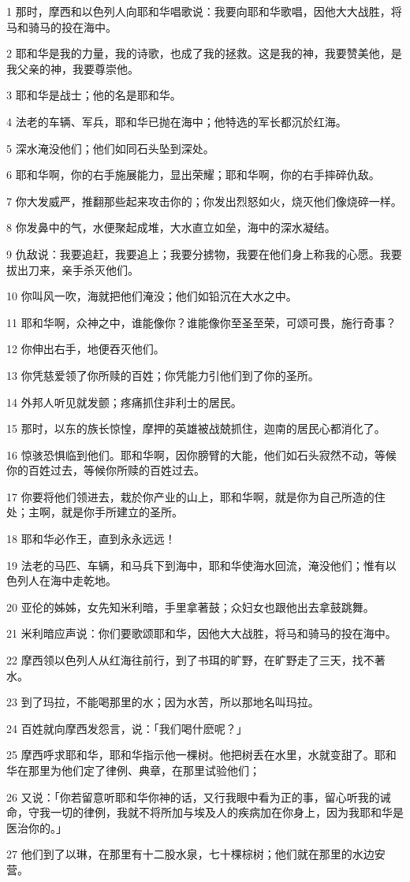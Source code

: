 \par 1 那时，摩西和以色列人向耶和华唱歌说：我要向耶和华歌唱，因他大大战胜，将马和骑马的投在海中。
\par 2 耶和华是我的力量，我的诗歌，也成了我的拯救。这是我的神，我要赞美他，是我父亲的神，我要尊崇他。
\par 3 耶和华是战士；他的名是耶和华。
\par 4 法老的车辆、军兵，耶和华已抛在海中；他特选的军长都沉於红海。
\par 5 深水淹没他们；他们如同石头坠到深处。
\par 6 耶和华啊，你的右手施展能力，显出荣耀；耶和华啊，你的右手摔碎仇敌。
\par 7 你大发威严，推翻那些起来攻击你的；你发出烈怒如火，烧灭他们像烧碎一样。
\par 8 你发鼻中的气，水便聚起成堆，大水直立如垒，海中的深水凝结。
\par 9 仇敌说：我要追赶，我要追上；我要分掳物，我要在他们身上称我的心愿。我要拔出刀来，亲手杀灭他们。
\par 10 你叫风一吹，海就把他们淹没；他们如铅沉在大水之中。
\par 11 耶和华啊，众神之中，谁能像你？谁能像你至圣至荣，可颂可畏，施行奇事？
\par 12 你伸出右手，地便吞灭他们。
\par 13 你凭慈爱领了你所赎的百姓；你凭能力引他们到了你的圣所。
\par 14 外邦人听见就发颤；疼痛抓住非利士的居民。
\par 15 那时，以东的族长惊惶，摩押的英雄被战兢抓住，迦南的居民心都消化了。
\par 16 惊骇恐惧临到他们。耶和华啊，因你膀臂的大能，他们如石头寂然不动，等候你的百姓过去，等候你所赎的百姓过去。
\par 17 你要将他们领进去，栽於你产业的山上，耶和华啊，就是你为自己所造的住处；主啊，就是你手所建立的圣所。
\par 18 耶和华必作王，直到永永远远！
\par 19 法老的马匹、车辆，和马兵下到海中，耶和华使海水回流，淹没他们；惟有以色列人在海中走乾地。
\par 20 亚伦的姊姊，女先知米利暗，手里拿著鼓；众妇女也跟他出去拿鼓跳舞。
\par 21 米利暗应声说：你们要歌颂耶和华，因他大大战胜，将马和骑马的投在海中。
\par 22 摩西领以色列人从红海往前行，到了书珥的旷野，在旷野走了三天，找不著水。
\par 23 到了玛拉，不能喝那里的水；因为水苦，所以那地名叫玛拉。
\par 24 百姓就向摩西发怨言，说：「我们喝什麽呢？」
\par 25 摩西呼求耶和华，耶和华指示他一棵树。他把树丢在水里，水就变甜了。耶和华在那里为他们定了律例、典章，在那里试验他们；
\par 26 又说：「你若留意听耶和华你神的话，又行我眼中看为正的事，留心听我的诫命，守我一切的律例，我就不将所加与埃及人的疾病加在你身上，因为我耶和华是医治你的。」
\par 27 他们到了以琳，在那里有十二股水泉，七十棵棕树；他们就在那里的水边安营。

